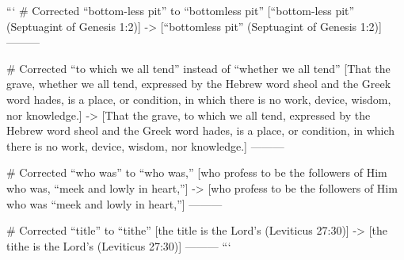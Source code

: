 ```
# Corrected “bottom-less pit” to “bottomless pit”
[“bottom-less pit” (Septuagint of Genesis 1:2)]
->
[“bottomless pit” (Septuagint of Genesis 1:2)]
---------

# Corrected “to which we all tend” instead of “whether we all tend”
[That the grave, whether we all tend, expressed by the Hebrew word sheol and the Greek word hades, is a place, or condition, in which there is no work, device, wisdom, nor knowledge.]
->
[That the grave, to which we all tend, expressed by the Hebrew word sheol and the Greek word hades, is a place, or condition, in which there is no work, device, wisdom, nor knowledge.]
---------

# Corrected “who was” to “who was,”
[who profess to be the followers of Him who was, “meek and lowly in heart,”]
->
[who profess to be the followers of Him who was “meek and lowly in heart,”]
---------

# Corrected “title” to “tithe”
[the title is the Lord's (Leviticus 27:30)]
->
[the tithe is the Lord's (Leviticus 27:30)]
---------
```